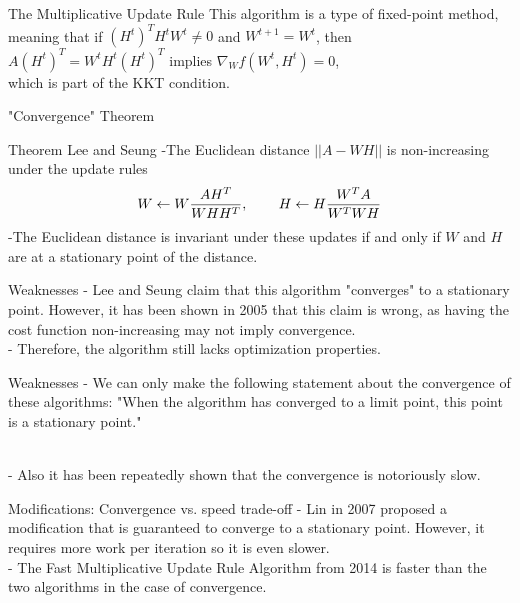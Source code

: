 \documentclass[aspectratio=169]{beamer}
\begin{document}
\begin{frame}{The Multiplicative Update Rule}
        This algorithm is a type of fixed-point method, meaning that if $(H^{t})^{T} H^{t} W^{t} \neq 0$ and
        $W^{t+1} = W^{t}$, then $A(H^{t})^{T} = W^{t}H^{t}(H^{t})^{T}$ implies 
        $\nabla_{W}f(W^{t}, H^{t}) = 0$,\\
        which is part of the KKT condition.
\end{frame}
\begin{frame}{"Convergence" Theorem}
    \begin{block}{Theorem Lee and Seung}
        -The Euclidean distance $||A - WH||$ is non-increasing under the update rules
        \begin{align*}
            W \gets W\frac{AH^T}{WHH^T}, \hspace{0.3in}
            H \gets H\frac{W^T A}{W^T WH} 
        \end{align*}
        -The Euclidean distance is invariant under these updates if and only if $W$ and $H$ are at
        a stationary point of the distance.
    \end{block}
\end{frame}
\begin{frame}{Weaknesses}
    - Lee and Seung claim that this algorithm "converges" to a stationary point. However, it has been shown in 2005 that this claim is wrong, as having the cost function non-increasing may not imply convergence.\\
    \vspace{0.2in}
    - Therefore, the algorithm still lacks optimization properties.\\
    \end{frame}
    \begin{frame}{Weaknesses}
    - We can only make the following statement about
    the convergence of these algorithms: "When the algorithm has converged to a limit point, this point is a stationary point."\\\
    
    - Also it has been repeatedly shown that the convergence is notoriously slow.
    \end{frame}
    \begin{frame}{Modifications: Convergence vs. speed trade-off}
    - Lin in 2007 proposed a modification that is guaranteed to converge to a stationary point. However, it requires more work per iteration so it is even slower.\\
    \vspace{0.2in}
    - The Fast Multiplicative Update Rule Algorithm from 2014 is faster than the two algorithms in the case of convergence.
\end{frame}
\end{document}
